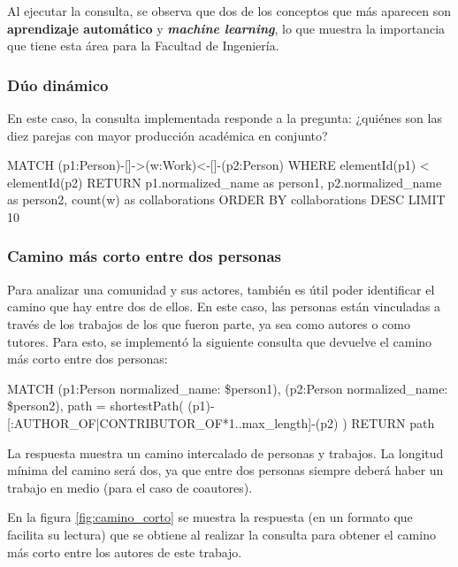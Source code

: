 \documentclass[journal]{IEEEtran}
\begin{document}
Al ejecutar la consulta, se observa que dos de los conceptos que más aparecen son \textbf{aprendizaje automático} y \textit{\textbf{machine learning}}, lo que muestra la importancia que tiene esta área para la Facultad de Ingeniería.

\subsubsection{Dúo dinámico}
En este caso, la consulta implementada responde a la pregunta: ¿quiénes son las diez parejas con mayor producción académica en conjunto?

\begin{sflisting}[style=sparql,caption= Parejas con mayor cantidad de artículos publicados en conjunto,label=duo_dinamico]
	MATCH (p1:Person)-[]->(w:Work)<-[]-(p2:Person)
	WHERE elementId(p1) < elementId(p2)
	RETURN p1.normalized_name as person1,
	p2.normalized_name as person2,
	count(w) as collaborations
	ORDER BY collaborations DESC
	LIMIT 10
\end{sflisting}

\subsubsection{Camino más corto entre dos personas}
Para analizar una comunidad y sus actores, también es útil poder identificar el camino que hay entre dos de ellos. En este caso, las personas están vinculadas a través de los trabajos de los que fueron parte, ya sea como autores o como tutores. Para esto, se implementó la siguiente consulta que devuelve el camino más corto entre dos personas:

\begin{sflisting}[style=sparql,caption= Camino más corto entre dos personas,label=camino_corto]
	MATCH
	(p1:Person {normalized_name: \$person1}),
	(p2:Person {normalized_name: \$person2}),
	path = shortestPath(
	(p1)-[:AUTHOR_OF|CONTRIBUTOR_OF*1..{max_length}]-(p2)
	)
	RETURN path
\end{sflisting}

La respuesta muestra un camino intercalado de personas y trabajos. La longitud mínima del camino será dos, ya que entre dos personas siempre deberá haber un trabajo en medio (para el caso de coautores).

En la figura \ref{fig:camino_corto} se muestra la respuesta (en un formato que facilita su lectura) que se obtiene al realizar la consulta para obtener el camino más corto entre los autores de este trabajo.
\end{document}
